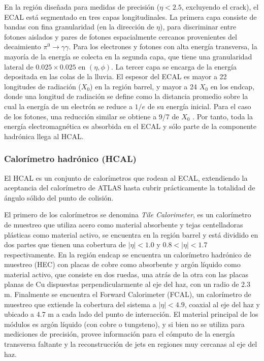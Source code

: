 En la región diseñada para medidas de precisión ($\eta < 2.5$, excluyendo el crack),
el ECAL está segmentado en tres capas longitudinales. La primera capa consiste de
bandas con fina granularidad (en la dirección de $\eta$), para discriminar entre fotones
aislados y pares de fotones espacialmente cercanos provenientes del decaimiento
$\pi^0\to\gamma\gamma$. Para los electrones y fotones con alta energía transversa, la mayoría
de la energía se colecta en la segunda capa, que tiene una granularidad lateral de
$0.025 \times 0.025$ en $(\eta, \phi)$. La tercer capa se encarga de la energía depositada en las
colas de la lluvia.
El espesor del ECAL es mayor a 22 longitudes de radiación ($X_0$) en la región
barrel, y mayor a 24 $X_0$ en los endcap, donde una longitud de radiación se define
como la distancia promedio sobre la cual la energía de un electrón se reduce a $1/e$
de su energía inicial. Para el caso de los fotones, una reducción similar se obtiene a
9/7 de $X_0$ . Por tanto, toda la energía electromagnética es absorbida en el ECAL y
sólo parte de la componente hadrónica llega al HCAL.

\subsubsection{Calorímetro hadrónico (HCAL)}

El HCAL es un conjunto de calorímetros que rodean al ECAL, extendiendo la aceptancia del calorímetro de ATLAS hasta cubrir prácticamente la totalidad de ángulo sólido del punto de colisión.

El primero de los calorímetros se denomina \textit{Tile Calorimeter}, es un calorímetro de muestreo que utiliza acero como material absorbente y tejas centelladoras plásticas como material activo, se encuentra en la región barrel y está dividido en dos partes que tienen una cobertura de $|\eta|<1.0$ y $0.8<|\eta|<1.7$ respectivamente. 
En la región endcap se encuentra un calorímetro hadrónico de muestreo (HEC) con placas de cobre como absorbente y argón líquido como material activo, que consiste en dos ruedas, una atrás de la otra con las placas planas de Cu dispuestas perpendicularmente al eje del haz, con un radio de 2.3 m. Finalmente se encuentra el Forward Calorimeter (FCAL), un calorímetro de muestreo que extiende la cobertura del sistema a $|\eta|<4.9$, coaxial
al eje del haz y ubicado a 4.7 m a cada lado del punto de interacción. El material
principal de los módulos es argón líquido (con cobre o tungsteno), y si bien no se
utiliza para mediciones de precisión, provee información para el cómputo de la energía transversa faltante y la reconstrucción de jets en regiones muy cercanas al eje
del haz.



